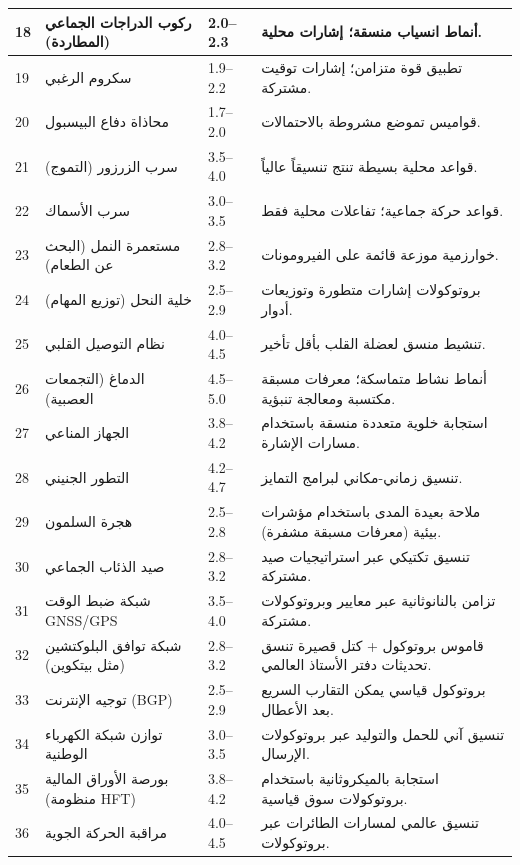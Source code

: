 \documentclass[13pt,a4paper]{article}
\begin{document}
\begin{longtable}{|p{0.8cm}|p{6.2cm}|p{3.0cm}|p{5.7cm}|}
		\hline
		18 & ركوب الدراجات الجماعي (المطاردة) & 2.0--2.3 & أنماط انسياب منسقة؛ إشارات محلية. \\
		\hline
		19 & سكروم الرغبي & 1.9--2.2 & تطبيق قوة متزامن؛ إشارات توقيت مشتركة. \\
		\hline
		20 & محاذاة دفاع البيسبول & 1.7--2.0 & قواميس تموضع مشروطة بالاحتمالات. \\
		\hline
		21 & سرب الزرزور (التموج) & 3.5--4.0 & قواعد محلية بسيطة تنتج تنسيقاً عالياً. \\
		\hline
		22 & سرب الأسماك & 3.0--3.5 & قواعد حركة جماعية؛ تفاعلات محلية فقط. \\
		\hline
		23 & مستعمرة النمل (البحث عن الطعام) & 2.8--3.2 & خوارزمية موزعة قائمة على الفيرومونات. \\
		\hline
		24 & خلية النحل (توزيع المهام) & 2.5--2.9 & بروتوكولات إشارات متطورة وتوزيعات أدوار. \\
		\hline
		25 & نظام التوصيل القلبي & 4.0--4.5 & تنشيط منسق لعضلة القلب بأقل تأخير. \\
		\hline
		26 & الدماغ (التجمعات العصبية) & 4.5--5.0 & أنماط نشاط متماسكة؛ معرفات مسبقة مكتسبة ومعالجة تنبؤية. \\
		\hline
		27 & الجهاز المناعي & 3.8--4.2 & استجابة خلوية متعددة منسقة باستخدام مسارات الإشارة. \\
		\hline
		28 & التطور الجنيني & 4.2--4.7 & تنسيق زماني-مكاني لبرامج التمايز. \\
		\hline
		29 & هجرة السلمون & 2.5--2.8 & ملاحة بعيدة المدى باستخدام مؤشرات بيئية (معرفات مسبقة مشفرة). \\
		\hline
		30 & صيد الذئاب الجماعي & 2.8--3.2 & تنسيق تكتيكي عبر استراتيجيات صيد مشتركة. \\
		\hline
		31 & شبكة ضبط الوقت GNSS/GPS & 3.5--4.0 & تزامن بالنانوثانية عبر معايير وبروتوكولات مشتركة. \\
		\hline
		32 & شبكة توافق البلوكتشين (مثل بيتكوين) & 2.8--3.2 & قاموس بروتوكول + كتل قصيرة تنسق تحديثات دفتر الأستاذ العالمي. \\
		\hline
		33 & توجيه الإنترنت (BGP) & 2.5--2.9 & بروتوكول قياسي يمكن التقارب السريع بعد الأعطال. \\
		\hline
		34 & توازن شبكة الكهرباء الوطنية & 3.0--3.5 & تنسيق آني للحمل والتوليد عبر بروتوكولات الإرسال. \\
		\hline
		35 & بورصة الأوراق المالية (منظومة HFT) & 3.8--4.2 & استجابة بالميكروثانية باستخدام بروتوكولات سوق قياسية. \\
		\hline
		36 & مراقبة الحركة الجوية & 4.0--4.5 & تنسيق عالمي لمسارات الطائرات عبر بروتوكولات. \\

\end{longtable}
\end{document}

